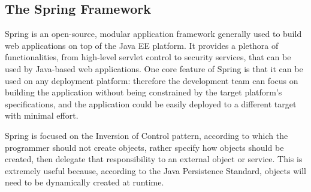 \documentclass[12pt]{article}
\begin{document}
\subsection{The Spring Framework}
Spring is an open-source, modular application framework generally used to build web applications on top of the Java EE platform. It provides a plethora of functionalities, from high-level servlet control to security services, that can be used by Java-based web applications. One core feature of Spring is that it can be used on any deployment platform: therefore the development team can focus on building the application without being constrained by the target platform's specifications, and the application could be easily deployed to a different target with minimal effort.

Spring is focused on the Inversion of Control pattern, according to which the programmer should not create objects, rather specify how objects should be created, then delegate that responsibility to an external object or service. This is extremely useful because, according to the Java Persistence Standard, objects will need to be dynamically created at runtime.
\end{document}
